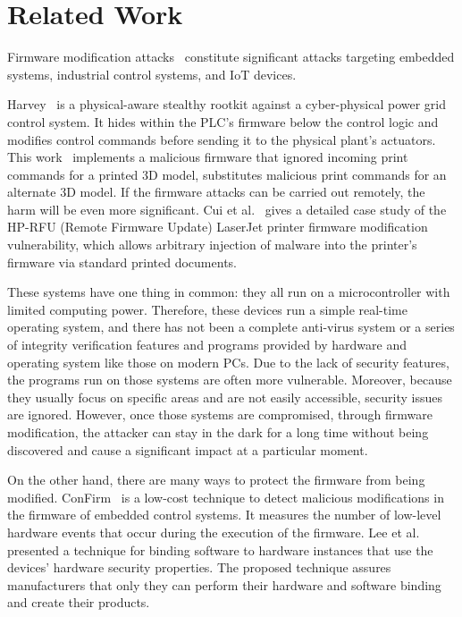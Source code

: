 \section{Related Work}
\label{sec:implant-relatedwork}



Firmware modification attacks~\cite{newman2011scada, basnight2013firmware, blanco2012one, cui2013firmware, konstantinou2015impact, schulz2017nexmon} constitute significant attacks targeting embedded systems, industrial control systems, and IoT devices. 

Harvey~\cite{garcia2017hey} is a physical-aware stealthy rootkit against a cyber-physical power grid control system. It hides within the PLC's firmware below the control logic and modifies control commands before sending it to the physical plant's actuators. This work~\cite{moore2017implications} implements a malicious firmware that ignored incoming print commands for a printed 3D model, substitutes malicious print commands for an alternate 3D model.  If the firmware attacks can be carried out remotely, the harm will be even more significant. Cui et al.~\cite{cui2013firmware} gives a detailed case study of the HP-RFU (Remote Firmware Update) LaserJet printer firmware modification vulnerability, which allows arbitrary injection of malware into the printer's firmware via standard printed documents.

These systems have one thing in common: they all run on a microcontroller with limited computing power. Therefore, these devices run a simple real-time operating system, and there has not been a complete anti-virus system or a series of integrity verification features and programs provided by hardware and operating system like those on modern PCs. Due to the lack of security features, the programs run on those systems are often more vulnerable. Moreover, because they usually focus on specific areas and are not easily accessible, security issues are ignored. However, once those systems are compromised, through firmware modification, the attacker can stay in the dark for a long time without being discovered and cause a significant impact at a particular moment.

On the other hand, there are many ways to protect the firmware from being modified. ConFirm~\cite{wang2015confirm} is a low-cost technique to detect malicious modifications in the firmware of embedded control systems. It measures the number of low-level hardware events that occur during the execution of the firmware. Lee et al.~\cite{lee2016binding} presented a technique for binding software to hardware instances that use the devices' hardware security properties. The proposed technique assures manufacturers that only they can perform their hardware and software binding and create their products.

